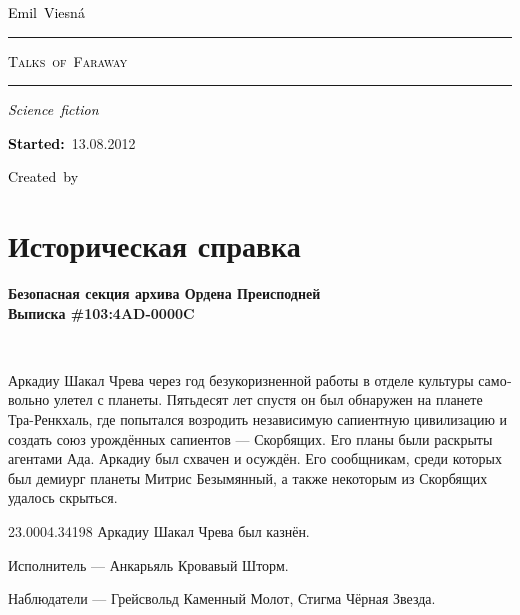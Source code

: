 \documentclass[a4paper,12pt,fleqn]{book}\usepackage{cooltooltips}\usepackage{polyglossia}\setdefaultlanguage[babelshorthands=true]{russian}\setotherlanguage{english}\defaultfontfeatures{Ligatures=TeX,Mapping=tex-text} \usepackage{xcolor}\definecolor{lightgray}{HTML}{bbbbbb}\color{lightgray}\newcommand{\ml}[3]{\textenglish{\textcolor{black}{#3}}}
\newcommand{\tofaauthor}{\ml{$0$}{Эмиль~Весна}{Emil~Viesn\'{a}}}
\newcommand{\tofatitle}{\ml{$0$}{ДАЛЁКИЕ~РЕЧИ}{Talks~of~Faraway}}
\newcommand{\tofastarted}{13.08.2012}
\newcommand{\asterism}{\vspace{1em}{\centering\Large\bfseries$\ast~\ast~\ast$\par}\vspace{1em}}
\begin{document}

\begin{titlepage}
{\centering{~\par}\vspace{0.25\textheight}
{\LARGE\tofaauthor}\par
\vspace{1.0cm}\rule{17em}{1pt}\par\vspace{0.3cm}
{\Huge\textsc{\tofatitle}\par}
\vspace{0.3cm}\rule{17em}{2pt}\par\vspace{1.0cm}
{\Large\textit{\ml{$0$}{Фантастический~роман}{Science~fiction}}\par}
\vspace{0.5cm}\asterism\par\vspace{1.0cm}
{\textbf{\ml{$0$}{Начато:}{Started:}}~\tofastarted\par}\vfill
{\Large\ml{$0$}{Создано~в}{Created~by}~\XeLaTeX}\par}
\end{titlepage}

\tableofcontents

\chapter*{Историческая справка}

\textbf{Безопасная секция архива Ордена Преисподней\\
Выписка \#103:4AD-0000C}

~

Аркадиу Шакал Чрева через год безукоризненной работы в отделе культуры самовольно улетел с планеты.
Пятьдесят лет спустя он был обнаружен на планете Тра-Ренкхаль, где попытался возродить независимую сапиентную цивилизацию и создать союз урождённых сапиентов --- Скорбящих.
Его планы были раскрыты агентами Ада.
Аркадиу был схвачен и осуждён.
Его сообщникам, среди которых был демиург планеты Митрис Безымянный, а также некоторым из Скорбящих удалось скрыться.

23.0004.34198 Аркадиу Шакал Чрева был казнён.

Исполнитель --- Анкарьяль Кровавый Шторм.

Наблюдатели --- Грейсвольд Каменный Молот, Стигма Чёрная Звезда.
\end{document}
